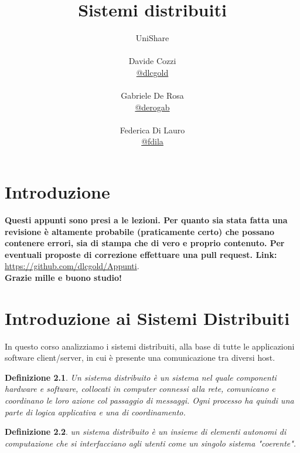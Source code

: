 \documentclass[a4paper,12pt, oneside]{book}
\title{Sistemi distribuiti}
\author{UniShare\\\\Davide Cozzi\\\href{https://t.me/dlcgold}{@dlcgold}\\\\Gabriele De Rosa\\\href{https://t.me/derogab}{@derogab} \\\\Federica Di Lauro\\\href{https://t.me/f_dila}{@f\textunderscore dila}}
\date{}
\begin{document}
\maketitle


\newtheorem{teorema}{Teorema}
\newtheorem{definizione}{Definizione}
\newtheorem{esempio}{Esempio}
\newtheorem{corollario}{Corollario}
\newtheorem{lemma}{Lemma}
\newtheorem{osservazione}{Osservazione}
\newtheorem{nota}{Nota}
\newtheorem{esercizio}{Esercizio}
\tableofcontents
\renewcommand{\chaptermark}[1]{%
	\markboth{\chaptername
		\ \thechapter.\ #1}{}}
\renewcommand{\sectionmark}[1]{\markright{\thesection.\ #1}}
\chapter{Introduzione}
\textbf{Questi appunti sono presi a le lezioni. Per quanto sia stata fatta una revisione è altamente probabile (praticamente certo) che possano contenere errori, sia di stampa che di vero e proprio contenuto. Per eventuali proposte di correzione effettuare una pull request. Link: } \url{https://github.com/dlcgold/Appunti}.\\
\textbf{Grazie mille e buono studio!}
\chapter{Introduzione ai Sistemi Distribuiti}
In questo corso analizziamo i sistemi distribuiti, alla base di tutte le applicazioni software 
client/server, in cui è presente una comunicazione tra diversi host.

\begin{definizione}
Un sistema distribuito è un sistema nel quale componenti hardware e software, collocati in computer
connessi alla rete, comunicano e coordinano le loro azione  col passaggio di messaggi.\newline
Ogni processo ha quindi una parte di logica applicativa e una di coordinamento. 
\end{definizione}

\begin{definizione}
un sistema distribuito è un insieme di elementi autonomi di computazione che si 
interfacciano agli utenti come un singolo sistema "coerente".
\end{definizione}
\end{document}
